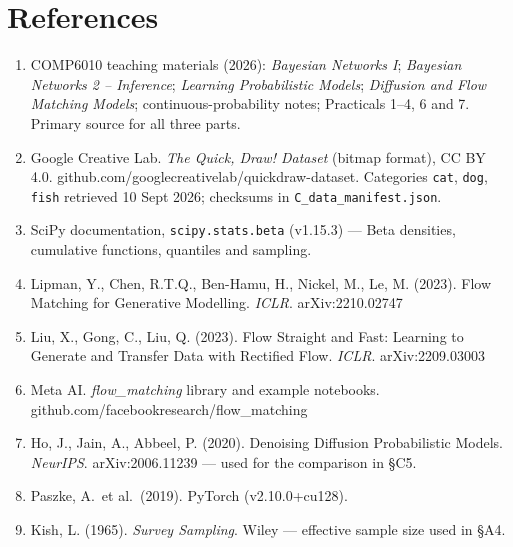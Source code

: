 \documentclass[12pt,a4paper]{article}
\begin{document}
\section*{References}
\scriptsize
\begin{enumerate}[leftmargin=1.4em,itemsep=0pt]
\item COMP6010 teaching materials (2026): \emph{Bayesian Networks I}; \emph{Bayesian Networks 2 --
Inference}; \emph{Learning Probabilistic Models}; \emph{Diffusion and Flow Matching Models};
continuous-probability notes; Practicals 1--4, 6 and 7. Primary source for all three parts.
\item Google Creative Lab. \emph{The Quick, Draw! Dataset} (bitmap format), CC BY 4.0.
github.com/googlecreativelab/quickdraw-dataset. Categories \texttt{cat}, \texttt{dog}, \texttt{fish} retrieved 10 Sept 2026; checksums in \texttt{C\_data\_manifest.json}.
\item SciPy documentation, \texttt{scipy.stats.beta} (v1.15.3) --- Beta densities, cumulative
functions, quantiles and sampling.
\item Lipman, Y., Chen, R.T.Q., Ben-Hamu, H., Nickel, M., Le, M. (2023). Flow Matching for Generative
Modelling. \emph{ICLR}. arXiv:2210.02747
\item Liu, X., Gong, C., Liu, Q. (2023). Flow Straight and Fast: Learning to Generate and Transfer Data
with Rectified Flow. \emph{ICLR}. arXiv:2209.03003
\item Meta AI. \emph{flow\_matching} library and example notebooks.
github.com/facebookresearch/flow\_matching
\item Ho, J., Jain, A., Abbeel, P. (2020). Denoising Diffusion Probabilistic Models. \emph{NeurIPS}. arXiv:2006.11239 --- used for the comparison in \S C5.
\item Paszke, A.\ et al.\ (2019). PyTorch (v2.10.0+cu128).
\item Kish, L. (1965). \emph{Survey Sampling}. Wiley --- effective sample size used in \S A4.
\end{enumerate}
\end{document}
